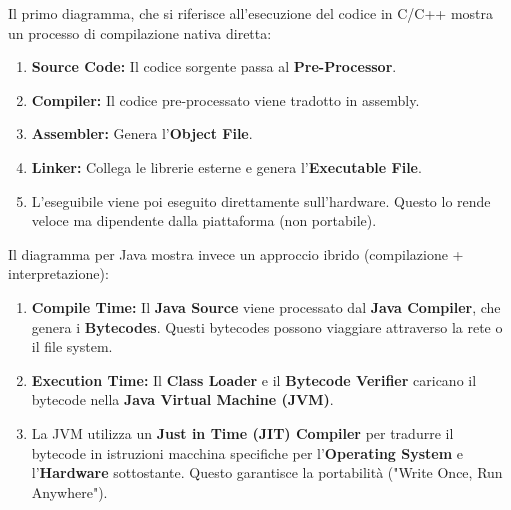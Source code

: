 \documentclass[12pt,a4paper,oneside]{book}
\begin{document}
Il primo diagramma, che si riferisce all'esecuzione del codice in C/C++ mostra un processo di compilazione nativa diretta:
\begin{enumerate}
    \item \textbf{Source Code:} Il codice sorgente passa al \textbf{Pre-Processor}.
    \item \textbf{Compiler:} Il codice pre-processato viene tradotto in assembly.
    \item \textbf{Assembler:} Genera l'\textbf{Object File}.
    \item \textbf{Linker:} Collega le librerie esterne e genera l'\textbf{Executable File}.
    \item L'eseguibile viene poi eseguito direttamente sull'hardware. Questo lo rende veloce ma dipendente dalla piattaforma (non portabile).
\end{enumerate}

Il diagramma per Java mostra invece un approccio ibrido (compilazione + interpretazione):
\begin{enumerate}
    \item \textbf{Compile Time:} Il \textbf{Java Source} viene processato dal \textbf{Java Compiler}, che genera i \textbf{Bytecodes}. Questi bytecodes possono viaggiare attraverso la rete o il file system.
    \item \textbf{Execution Time:} Il \textbf{Class Loader} e il \textbf{Bytecode Verifier} caricano il bytecode nella \textbf{Java Virtual Machine (JVM)}.
    \item La JVM utilizza un \textbf{Just in Time (JIT) Compiler} per tradurre il bytecode in istruzioni macchina specifiche per l'\textbf{Operating System} e l'\textbf{Hardware} sottostante. Questo garantisce la portabilità ("Write Once, Run Anywhere").
\end{enumerate}
\end{document}
